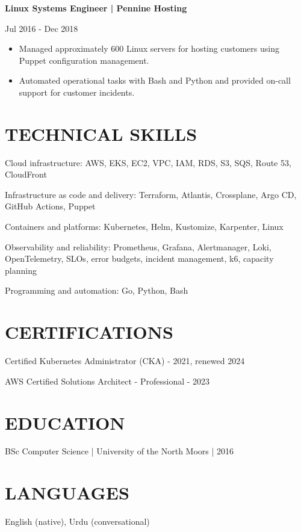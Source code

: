 \documentclass[11pt,a4paper]{article}
\newcommand{\cvsection}[1]{\section*{#1}}
\newcommand{\cvrole}[2]{\needspace{5\baselineskip}\noindent\textbf{#1}\par\noindent #2\par}
\begin{document}
\cvrole{Linux Systems Engineer | Pennine Hosting}{Jul 2016 - Dec 2018}
\begin{itemize}
\item Managed approximately 600 Linux servers for hosting customers using Puppet configuration management.
\item Automated operational tasks with Bash and Python and provided on-call support for customer incidents.
\end{itemize}

\cvsection{TECHNICAL SKILLS}
Cloud infrastructure: AWS, EKS, EC2, VPC, IAM, RDS, S3, SQS, Route 53, CloudFront\par
Infrastructure as code and delivery: Terraform, Atlantis, Crossplane, Argo CD, GitHub Actions, Puppet\par
Containers and platforms: Kubernetes, Helm, Kustomize, Karpenter, Linux\par
Observability and reliability: Prometheus, Grafana, Alertmanager, Loki, OpenTelemetry, SLOs, error budgets, incident management, k6, capacity planning\par
Programming and automation: Go, Python, Bash

\cvsection{CERTIFICATIONS}
Certified Kubernetes Administrator (CKA) - 2021, renewed 2024\par
AWS Certified Solutions Architect - Professional - 2023

\cvsection{EDUCATION}
BSc Computer Science | University of the North Moors | 2016

\cvsection{LANGUAGES}
English (native), Urdu (conversational)
\end{document}
